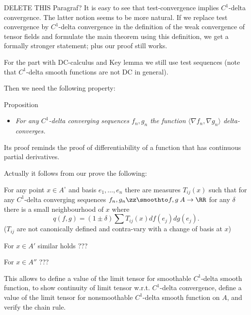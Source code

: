 
{\color{blue} DELETE THIS Paragraf? It is easy to see that test-convergence implies $C^1$-delta convergence.
The latter notion seems to be more natural.
If we replace test convergence
by $C^1$-delta convergence
in the definition of the weak convergence of tensor fields and
formulate the main theorem using this definition, we get a formally stronger
statement; plus our proof still works.

For the part with DC-calculus and 
Key lemma we still use test sequences
(note that $C^1$-delta smooth functions are not DC in general).
}
Then we need the following property:

\begin{thm}{Proposition}
\begin{itemize}
 \item \textit{For any  $C^1$-delta converging sequences $f_n, g_n$ the function
$\langle \nabla f_n , \nabla g_n
\rangle$ delta-converges.}
\end{itemize}
\end{thm}
Its proof reminds the proof of differentiability of a function that has continuous partial derivatives.





















{\color{blue}
Actually it follows from our  prove the following:


For any point $x\in A^\circ$
and basis $e_1,\dots, e_n$
there are measures
$T_{ij}(x)$ such that
for any $C^1$-delta converging sequences
$f_{n}, g_n\zz\smoothto  f,g\:A\to \RR$
for any $\delta$
there is a small neighbourhood of $x$ where
$$q(f,g)=(1\pm \delta)\sum T_{ij}(x)df(e_j)dg(e_j).$$ ($T_{ij}$ are
not canonically defined and contra-vary with a change of basis at $x$) 

For $x\in A'$ similar holds ???

For $x\in A''$  ???

This allows to define a value of the limit 
tensor for smoothable $C^1$-delta smooth
function,
to show continuity of limit tensor w.r.t.
$C^1$-delta convergence,
 define a value of the limit 
tensor for nonsmoothable $C^1$-delta smooth
function on $A$, and verify
the chain rule.
}


















